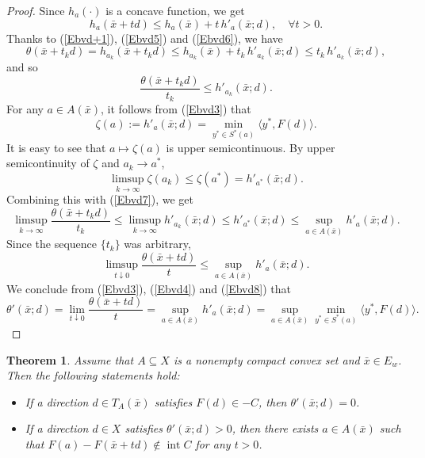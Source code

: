 \documentclass[11pt]{article}
\newtheorem{theorem}{Theorem}[section]
\begin{document}
\begin{proof}
	Since  $h_a\left( \cdot \right)$  is a  concave function, we get
\begin{equation}\label{Ebvd6}	
	 h_a(\bar x+td)\le h_a(\bar x)+t\,h'_a(\bar x;d), \quad  \forall  t>0. 
\end{equation} 
	 Thanks to (\ref{Ebvd+1}), (\ref{Ebvd5}) and (\ref{Ebvd6}), we have
	\[
	\theta(\bar x+t_k d)=h_{a_k}(\bar x+t_k d)
	\le h_{a_k}(\bar x)+t_k\,h'_{a_k}(\bar x;d)
	\le t_k\,h'_{a_k}(\bar x;d),
	\]
and so
\begin{equation}\label{Ebvd7}	
	\frac{\theta(\bar x+t_k d)}{t_k}\le h'_{a_k}(\bar x;d).
\end{equation} 
For any $a\in A(\bar x)$,  it follows from  (\ref{Ebvd3})  that
	\[
\zeta (a):=h'_a(\bar x;d)=\min_{y^*\in S^*(a)}\langle y^*,F(d)\rangle. 
\]
It is easy to see that  $a\mapsto \zeta(a)$ is upper semicontinuous. By upper semicontinuity of $\zeta$ and $a_k\to a^*$,
	\[
	\limsup_{k\to\infty} \zeta(a_k)\le \zeta(a^*)=h'_{a^*}(\bar x;d).
	\]
Combining this with (\ref{Ebvd7}), we get
	\[
	\limsup_{k\to\infty}\frac{\theta(\bar x+t_k d)}{t_k}  \le   	\limsup_{k\to\infty}   h'_{a_k}(\bar x;d)
	\le h'_{a^*}(\bar x;d)
	\le\sup_{a\in A(\bar x)}h'_a(\bar x;d).
	\]
	Since the sequence $\{t_k\}$ was arbitrary,
\begin{equation}\label{Ebvd8}	
	\limsup_{t\downarrow0}\frac{\theta(\bar x+td)}{t}
	\le\sup_{a\in A(\bar x)}h'_a(\bar x;d).  
\end{equation} 
		 We conclude from (\ref{Ebvd3}),  (\ref{Ebvd4})  and  (\ref{Ebvd8})  that
	 	\[
	\theta'(\bar x;d)=\lim_{t\downarrow0}\frac{\theta(\bar x+td)}{t}
	=\sup_{a\in A(\bar x)}h'_a(\bar x;d) =\sup_{a\in A(\bar x)}\min_{y^*\in S^*(a)}\langle y^*,F(d)\rangle.
	\]
\end{proof}

 

\begin{theorem} 
	Assume that $A \subseteq X$ is a nonempty compact convex set and $\bar x \in E_w$.
 	Then the following statements hold:
	\begin{itemize}
		\item[(i)]  If a direction $d \in T_A(\bar x)$ satisfies $F(d) \in -C$, then $\theta'(\bar x; d) = 0$.
			\item[(ii)]  If a direction $d \in X$ satisfies $\theta'(\bar x; d) > 0$, then there exists $a \in A(\bar x)$ such that   $F(a) - F(\bar x + t d) \notin \operatorname{int} C$  for any $t > 0$.
	\end{itemize}
\end{theorem}
\end{document}
